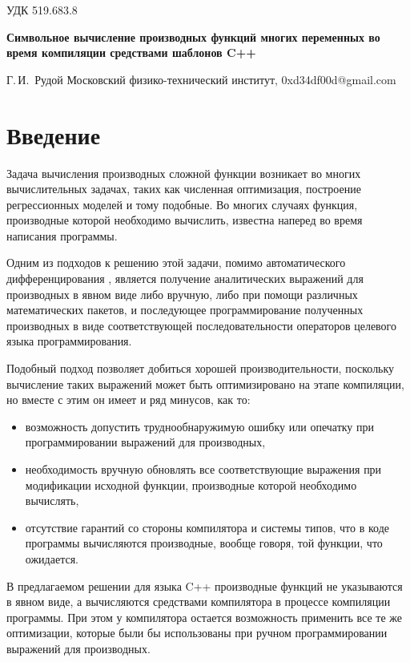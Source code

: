 \documentclass[11pt,a4paper]{article}
\begin{document}
УДК 519.683.8
\begin{center}
  \textbf{Символьное вычисление производных функций многих переменных во время компиляции средствами шаблонов C++}

  \bigskip
  Г.\,И.~Рудой
  Московский физико-технический институт, 0xd34df00d@gmail.com
\end{center}

\section{Введение}

Задача вычисления производных сложной функции возникает во многих вычислительных
задачах, таких как численная оптимизация, построение регрессионных моделей
\cite{Rudoy16StabilityAnalysis} и тому подобные. Во многих случаях функция,
производные которой необходимо вычислить, известна наперед во время написания
программы.

Одним из подходов к решению этой задачи, помимо автоматического дифференцирования \cite{Neidinger2010Introduction},
является получение аналитических выражений для производных в явном виде либо вручную,
либо при помощи различных математических пакетов, и последующее программирование
полученных производных в виде соответствующей последовательности операторов целевого
языка программирования.

Подобный подход позволяет добиться хорошей производительности, поскольку вычисление
таких выражений может быть оптимизировано на этапе компиляции, но вместе с этим он
имеет и ряд минусов, как то:
\begin{itemize}
  \item возможность допустить труднообнаружимую ошибку или опечатку при
	программировании выражений для производных,
  \item необходимость вручную обновлять все соответствующие выражения при модификации
	исходной функции, производные которой необходимо вычислять,
  \item отсутствие гарантий со стороны компилятора и системы типов, что в коде
	программы вычисляются производные, вообще говоря, той функции, что ожидается.
\end{itemize}

В предлагаемом решении для языка C++ производные функций не указываются в явном виде,
а вычисляются средствами компилятора в процессе компиляции программы. При этом у
компилятора остается возможность применить все те же оптимизации, которые были бы
использованы при ручном программировании выражений для производных.
\end{document}
